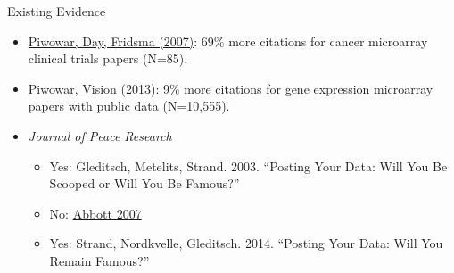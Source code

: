 \documentclass{beamer}
\begin{document}
\begin{frame}{Existing Evidence}
\begin{itemize}
\item \href{http://journals.plos.org/plosone/article?id=10.1371/journal.pone.0000308}{Piwowar, Day, Fridsma (2007)}: 69\% more citations for cancer microarray clinical trials papers (N=85).
\item \href{https://peerj.com/articles/175/}{Piwowar, Vision (2013)}: 9\% more citations for gene expression microarray papers with public data (N=10,555).
\item \textit{Journal of Peace Research}
\begin{itemize}
\item
Yes: Gleditsch, Metelits, Strand. 2003. ``Posting Your Data: Will You Be Scooped or Will You Be Famous?''
\item No: \href{http://journals.sagepub.com/doi/abs/10.1177/0049124107306664}{Abbott 2007}
\item Yes: Strand, Nordkvelle, Gleditsch. 2014. ``Posting Your Data: Will You Remain Famous?''

\end{itemize}
\end{itemize}
\end{frame}
\end{document}
